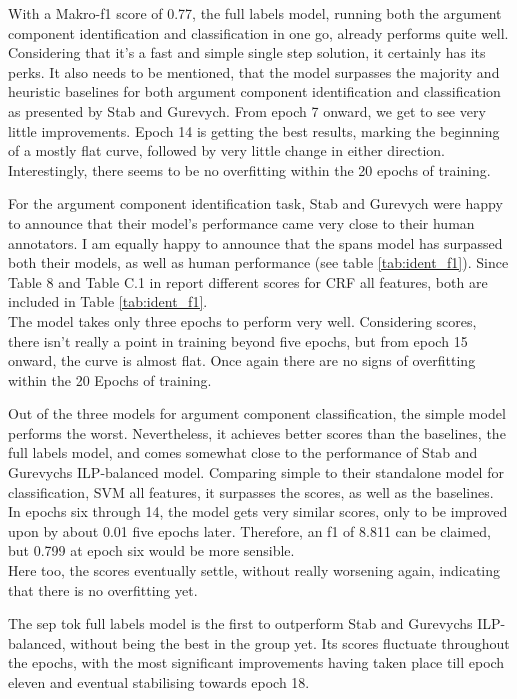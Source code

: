 \documentclass[12]{article}
\theoremstyle{mytheoremstyle}
\theoremstyle{mytheoremstyle}
\theoremstyle{myproblemstyle}
\begin{document}
  With a Makro-f1 score of 0.77, the full labels model, running both the argument component identification and classification in one go, already performs quite well. 
  Considering that it's a fast and simple single step solution, it certainly has its perks. 
  It also needs to be mentioned, that the model surpasses the majority and heuristic baselines for both argument component identification and classification as presented by Stab and Gurevych.
  From epoch 7 onward, we get to see very little improvements. 
  Epoch 14 is getting the best results, marking the beginning of a mostly flat curve, followed by very little change in either direction. 
  Interestingly, there seems to be no overfitting within the 20 epochs of training.

  For the argument component identification task, Stab and Gurevych were happy to announce that their model's performance came very close to their human annotators. 
  I am equally happy to announce that the spans model has surpassed both their models, as well as human performance (see table \ref{tab:ident_f1}). 
  Since Table 8 and Table C.1 in \cite{stab-gurevych-2017-parsing} report different scores for CRF all features, both are included in Table \ref{tab:ident_f1}.\\
  The model takes only three epochs to perform very well. 
  Considering scores, there isn't really a point in training beyond five epochs, but from epoch 15 onward, the curve is almost flat. 
  Once again there are no signs of overfitting within the 20 Epochs of training. 

  Out of the three models for argument component classification, the simple model performs the worst. 
  Nevertheless, it achieves better scores than the baselines, the full labels model, and comes somewhat close to the performance of Stab and Gurevychs ILP-balanced model. 
  Comparing simple to their standalone model for classification, SVM all features, it surpasses the scores, as well as the baselines.\\
  In epochs six through 14, the model gets very similar scores, only to be improved upon by about 0.01 five epochs later. 
  Therefore, an f1 of 8.811 can be claimed, but 0.799 at epoch six would be more sensible.\\
  Here too, the scores eventually settle, without really worsening again, indicating that there is no overfitting yet.

  The sep tok full labels model is the first to outperform Stab and Gurevychs ILP-balanced, without being the best in the group yet. 
  Its scores fluctuate throughout the epochs, with the most significant improvements having taken place till epoch eleven and eventual stabilising towards epoch 18.
\end{document}
